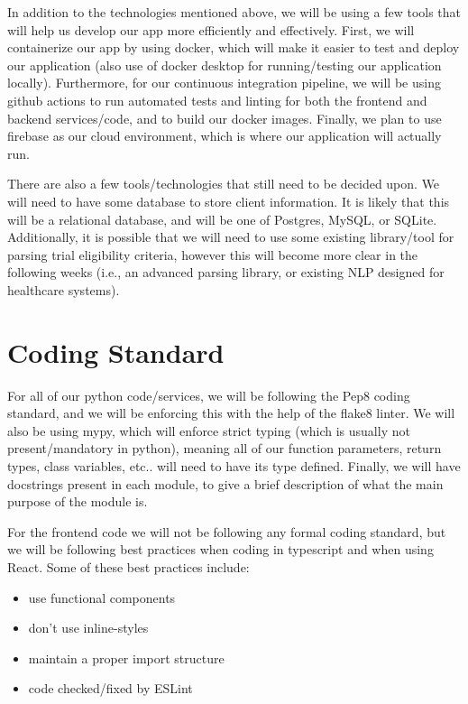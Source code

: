 \documentclass{article}
\begin{document}
In addition to the technologies mentioned above, we will be using a few tools that will help us 
develop our app more efficiently and effectively. First, we will containerize our app
by using docker, which will make it easier to test and deploy our application (also use of docker desktop for running/testing
our application locally). Furthermore, for our continuous 
integration pipeline, we will be using github actions to run automated tests and linting for both the frontend and backend 
services/code, and to build our docker images. Finally, we plan to use firebase as our cloud environment, which
is where our application will actually run.

There are also a few tools/technologies that still need to be decided upon. We will need to have some database to store
client information. It is likely that this will be a relational database, and will be one of Postgres, MySQL, or SQLite.
Additionally, it is possible that we will need to use some existing library/tool for parsing trial eligibility criteria, however this 
will become more clear in the following weeks (i.e., an advanced parsing library, or existing NLP designed for healthcare systems).

\section{Coding Standard}

For all of our python code/services, we will be following the Pep8 coding standard, and we will be enforcing this 
with the help of the flake8 linter. We will also be using mypy, which will enforce strict typing (which is usually not present/mandatory
in python), meaning all of our function parameters, return types, class variables, etc.. will need to have its type defined. Finally, we will
have docstrings present in each module, to give a brief description of what the main purpose of the module is.

For the frontend code we will not be following any formal coding standard, but we will be following best practices
when coding in typescript and when using React. Some of these best practices include:
\begin{itemize}
	\item use functional components
	\item don't use inline-styles
	\item maintain a proper import structure
	\item code checked/fixed by ESLint
\end{itemize}
\end{document}
